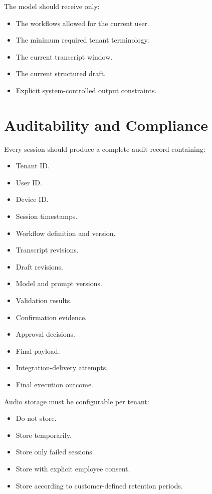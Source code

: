 \documentclass[11pt,a4paper]{article}
\begin{document}
The model should receive only:

\begin{itemize}
\item The workflows allowed for the current user.
\item The minimum required tenant terminology.
\item The current transcript window.
\item The current structured draft.
\item Explicit system-controlled output constraints.
\end{itemize}

\section{Auditability and Compliance}

Every session should produce a complete audit record containing:

\begin{itemize}
\item Tenant ID.
\item User ID.
\item Device ID.
\item Session timestamps.
\item Workflow definition and version.
\item Transcript revisions.
\item Draft revisions.
\item Model and prompt versions.
\item Validation results.
\item Confirmation evidence.
\item Approval decisions.
\item Final payload.
\item Integration-delivery attempts.
\item Final execution outcome.
\end{itemize}

Audio storage must be configurable per tenant:

\begin{itemize}
\item Do not store.
\item Store temporarily.
\item Store only failed sessions.
\item Store with explicit employee consent.
\item Store according to customer-defined retention periods.
\end{itemize}
\end{document}

